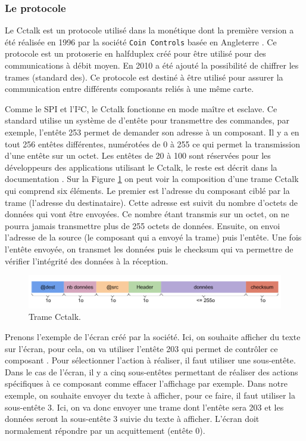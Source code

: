 \documentclass[a4paper]{article}
\begin{document}
\subsubsection{Le protocole}

Le Cctalk est un protocole utilisé dans la monétique dont la première version a
été réalisée en 1996 par la société \verb|Coin Controls| basée en Angleterre
\cite{cctalkpt1}. Ce protocole est un \gls{protoserie} en \gls{halfduplex} créé
pour être utilisé pour des communications à débit moyen. En 2010 a été ajouté la
possibilité de chiffrer les trames (standard \gls{des}). Ce protocole est
destiné à être utilisé pour assurer la communication entre différents composants
reliés à une même carte.

Comme le SPI et l'I²C, le Cctalk fonctionne en mode maître et esclave. Ce
standard utilise un système de d'entête pour transmettre des commandes, par
exemple, l'entête 253 permet de demander son adresse à un composant. Il y a en
tout 256 entêtes différentes, numérotées de 0 à 255 ce qui permet la
transmission d'une entête sur un octet. Les entêtes de 20 à 100 sont réservées
pour les développeurs des applications utilisant le Cctalk, le reste est décrit
dans la documentation \cite{cctalkpt2}. Sur la Figure \ref{tramecctalk} on peut
voir la composition d'une trame Cctalk qui comprend six éléments. Le premier est
l'adresse du composant ciblé par la trame (l'adresse du destinataire). Cette
adresse est suivit du nombre d'octets de données qui vont être envoyées. Ce
nombre étant transmis sur un octet, on ne pourra jamais transmettre plus de 255
octets de données. Ensuite, on envoi l'adresse de la source (le composant qui a
envoyé la trame) puis l'entête. Une fois l'entête envoyée, on transmet les
données puis le checksum qui va permettre de vérifier l'intégrité des données à
la réception.

\begin{figure}[h!]
  \begin{center}
  \includegraphics[scale=0.4]{./img/trame-cctalk.png}
  \caption{Trame Cctalk.}
    \label{tramecctalk}
  \end{center}
\end{figure}

Prenons l'exemple de l'écran créé par la société. Ici, on souhaite afficher du
texte sur l'écran, pour cela, on va utiliser l'entête 203 qui permet de
contrôler ce composant \cite{cctalkpt2}. Pour sélectionner l'action à réaliser,
il faut utiliser une sous-entête. Dans le cas de l'écran, il y a cinq
sous-entêtes permettant de réaliser des actions spécifiques à ce composant comme
effacer l'affichage par exemple. Dans notre exemple, on souhaite envoyer du
texte à afficher, pour ce faire, il faut utiliser la sous-entête 3. Ici, on va
donc envoyer une trame dont l'entête sera 203 et les données seront la
sous-entête 3 suivie du texte à afficher. L'écran doit normalement répondre par
un acquittement (entête 0).
\end{document}
